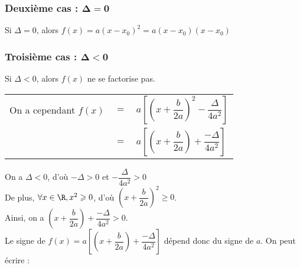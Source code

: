 \newpage

\subsubsection{Deuxième cas : $\mathbf{\Delta = 0}$}

Si $\Delta = 0$, alors $f\left(x\right) = a\left(x-x_0\right)^2 = a\left(x-x_0\right)\left(x-x_0\right)$ \\


\vspace*{.3cm}

\subsubsection{Troisième cas : $\mathbf{\Delta < 0}$}

Si $\Delta < 0$, alors $f\left(x\right)$ ne se factorise pas.  \\

\begin{tabular}{lll}
On a cependant $f\left(x\right)$ & $ = $ & $ a\left[\left(x+ \dfrac{b}{2a}\right)^2 - \dfrac{\Delta}{4a^2}\right]$ \\
& $=$ & $a\left[\left(x+\dfrac{b}{2a}\right) + \dfrac{-\Delta}{4a^2}\right]$ \\
\end{tabular}

\vspace*{.3cm}

On a $\Delta <0$, d'où $-\Delta > 0$ et $-\dfrac{\Delta}{4a^2} > 0$ \\

De plus, $\forall x \in \R, x^2 \geqslant 0$, d'où $\left(x+\dfrac{b}{2a}\right)^2 \geqslant 0$. \\

Ainsi, on a $\left(x+\dfrac{b}{2a}\right) + \dfrac{-\Delta}{4a^2} > 0$. \\

Le signe de $f\left(x\right) = a\left[\left(x+\dfrac{b}{2a}\right) + \dfrac{-\Delta}{4a^2}\right] $ dépend donc du signe de $a$. On peut écrire : \\

